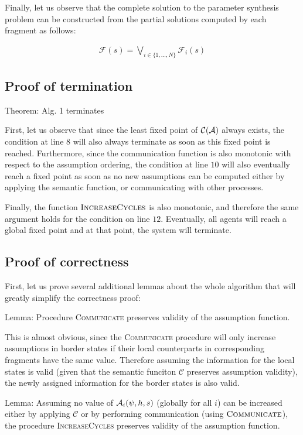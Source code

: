 Finally, let us observe that the complete solution to the parameter synthesis problem can be constructed from the partial solutions computed by each fragment as follows:

\begin{align*}
	\mathcal{F}(s) = \bigvee_{i \in \{1, \ldots, N \}} \mathcal{F}_i(s)
\end{align*}

\subsection{Proof of termination}

Theorem: Alg. 1 terminates

First, let us observe that since the least fixed point of $\mathcal{C}(\mathcal{A})$ always exists, the condition at line $8$ will also always terminate as soon as this fixed point is reached. Furthermore, since the communication function is also monotonic with respect to the assumption ordering, the condition at line $10$ will also eventually reach a fixed point as soon as no new assumptions can be computed either by applying the semantic function, or communicating with other processes.

Finally, the function $\textsc{IncreaseCycles}$ is also monotonic, and therefore the same argument holds for the condition on line $12$. Eventually, all agents will reach a global fixed point and at that point, the system will terminate.

\subsection{Proof of correctness}

First, let us prove several additional lemmas about the whole algorithm that will greatly simplify the correctness proof:

Lemma: Procedure \textsc{Communicate} preserves validity of the assumption function.

This is almost obvious, since the \textsc{Communicate} procedure will only increase assumptions in border states if their local counterparts in corresponding fragments have the same value. Therefore assuming the information for the local states is valid (given that the semantic funciton $\mathcal{C}$ preserves assumption validity), the newly assigned information for the border states is also valid.

Lemma: Assuming no value of $\mathcal{A}_i(\psi, h, s)$ (globally for all $i$) can be increased either by applying $\mathcal{C}$ or by performing communication (using $\textsc{Communicate}$), the procedure \textsc{IncreaseCycles} preserves validity of the assumption function.


